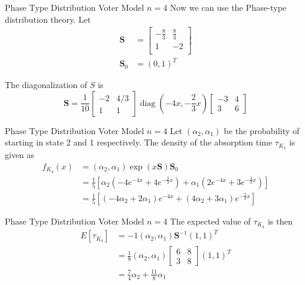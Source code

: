 \documentclass{beamer}
\theoremstyle{definition}
\begin{document}
\begin{frame}{Phase Type Distribution Voter Model $n = 4$}
Now we can use the Phase-type distribution theory.
Let
    \begin{align*}
    \mathbf{S} &= \begin{bmatrix}
    -\frac{8}{3} & \frac{8}{3}\\
    1 & -2\\
    \end{bmatrix}\\
    \mathbf{S}_0 &= (0, 1)^T
\end{align*}

The diagonalization of $S$ is
$$
\mathbf{S} = \frac{1}{10} \begin{bmatrix}
    -2 & 4/3\\
    1 & 1
\end{bmatrix} \operatorname{diag}(-4x, - \frac{2}{3} x)
 \begin{bmatrix}
    -3 & 4\\
    3 & 6
\end{bmatrix}
$$
\end{frame}

\begin{frame}{Phase Type Distribution Voter Model $n = 4$}
    Let $(\alpha_2, \alpha_1)$ be the probability of starting in state 2 and 1 respectively.
    The density of the absorption time $\tau_{K_4}$ is given as
\begin{align*}
    f_{K_4}(x) &= (\alpha_2, \alpha_1) \exp(x\mathbf{S}) \mathbf{S}_0\\
    &= \frac{1}{5} \left[ \alpha_2 \left( -4 e^{-4x} + 4 e^{-\frac{2}{3} x} \right) + \alpha_1 \left( 2 e^{-4x} + 3 e^{-\frac{2}{3} x} \right) \right]\\
&= \frac{1}{5} \left[ (-4 \alpha_2 + 2 \alpha_1) e^{-4x} + (4 \alpha_2 + 3 \alpha_1) e^{-\frac{2}{3} x}\right]
\end{align*}
\end{frame}

\begin{frame}{Phase Type Distribution Voter Model $n = 4$}
    The expected value of $\tau_{K_4}$ is then
\begin{align*}
    E[\tau_{K_4}] &= -1 (\alpha_2, \alpha_1) \mathbf{S}^{-1} (1, 1)^T\\
    &= \frac{1}{8} (\alpha_2, \alpha_1) \begin{bmatrix}
    6 & 8\\
    3 & 8
    \end{bmatrix} (1,1)^T\\
    &= \frac{7}{4} \alpha_2 + \frac{11}{8} \alpha_1
\end{align*}
\end{frame}
\end{document}
